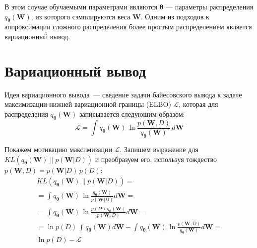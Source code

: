 \documentclass{article}
\numberwithin{equation}{section}
\begin{document}
    В этом случае обучаемыми параметрами являются $\pmb{\theta}$
    --- параметры распределения $q_{\pmb{\theta}}(\pmb{W})$,
    из которого сэмплируются веса $\pmb{W}$.
    Одним из подходов к аппроксимации сложного распределения более простым
    распределением является вариационный вывод.

    \section{Вариационный вывод}

    Идея вариационного вывода~--- сведение задачи байесовского вывода
    к задаче максимизации нижней вариационной границы (ELBO) $\mathcal{L}$,
    которая для распределения $q_{\pmb{\theta}}(\pmb{W})$
    записывается следующим образом:
    \begin{equation}
        \mathcal{L}
        =
            \int_{}{
                q_{\pmb{\theta}}(\pmb{W})
                \,
                \ln{
                    \frac
                        {p(\pmb{W}, D)}
                        {q_{\pmb{\theta}}(\pmb{W})}
                }
                \,
                d\pmb{W}
            }
    \end{equation}

    Покажем мотивацию максимизации $\mathcal{L}$.
    Запишем выражение для
    $
    KL(
        q_{\pmb{\theta}}(\pmb{W})
        \parallel
        p(\pmb{W}| D)
    )
    $
    и преобразуем его, используя тождество $p(\pmb{W}, D) = p(\pmb{W}| D) \, p(D)$:
    \begin{equation}
    \begin{split}
        KL(
            q_{\pmb{\theta}}(\pmb{W})
            \parallel
            p(\pmb{W}| D)
        ) = \\
        =
            \int_{}{
                q_{\pmb{\theta}}(\pmb{W})
                \,
                \ln{
                    \frac
                        {
                            q_{\pmb{\theta}}(\pmb{W})
                        }
                        {p(\pmb{W} | D)}
                }
                d\pmb{W}
            }
        = \\
        =
            \int_{}{
                q_{\pmb{\theta}}(\pmb{W})
                \,
                \ln{
                    \frac
                        {
                            p(D)
                            \,
                            q_{\pmb{\theta}}(\pmb{W})
                        }
                        {p(\pmb{W}, D)}
                }
                d\pmb{W}
            }
        = \\
        =
            \ln{p(D)}
            \,
            \int_{}{
                q_{\pmb{\theta}}(\pmb{W}) d\pmb{W}
            }
            -
            \int_{}{
                q_{\pmb{\theta}}(\pmb{W})
                \,
                \ln{
                    \frac
                        {p(\pmb{W}, D)}
                        {q_{\pmb{\theta}}(\pmb{W})}
                }
                d\pmb{W}
            }
        = \\
            \ln{p(D)} - \mathcal{L}
    \end{split}
    \end{equation}
\end{document}
